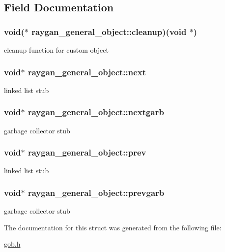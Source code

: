 \subsection{Field Documentation}
\hypertarget{structraygan__general__object_aa4c5799d4485b20618b80d670c55b598}{
\subsubsection[{cleanup}]{\setlength{\rightskip}{0pt plus 5cm}void($\ast$ raygan\+\_\+general\+\_\+object\+::cleanup)(void $\ast$)}}\label{structraygan__general__object_aa4c5799d4485b20618b80d670c55b598}
cleanup function for custom object \hypertarget{structraygan__general__object_abca7656e199e85edfa1304150cb2d7d9}{
\subsubsection[{next}]{\setlength{\rightskip}{0pt plus 5cm}void$\ast$ raygan\+\_\+general\+\_\+object\+::next}}\label{structraygan__general__object_abca7656e199e85edfa1304150cb2d7d9}
linked list stub \hypertarget{structraygan__general__object_a97be0f07a3b6afe858c5c6ba8f3e1987}{
\subsubsection[{nextgarb}]{\setlength{\rightskip}{0pt plus 5cm}void$\ast$ raygan\+\_\+general\+\_\+object\+::nextgarb}}\label{structraygan__general__object_a97be0f07a3b6afe858c5c6ba8f3e1987}
garbage collector stub \hypertarget{structraygan__general__object_aa8f4b6b7ad65fa40342f28c9ce30cb6b}{
\subsubsection[{prev}]{\setlength{\rightskip}{0pt plus 5cm}void$\ast$ raygan\+\_\+general\+\_\+object\+::prev}}\label{structraygan__general__object_aa8f4b6b7ad65fa40342f28c9ce30cb6b}
linked list stub \hypertarget{structraygan__general__object_a571269e726fb52755234c73b02ad9ea8}{
\subsubsection[{prevgarb}]{\setlength{\rightskip}{0pt plus 5cm}void$\ast$ raygan\+\_\+general\+\_\+object\+::prevgarb}}\label{structraygan__general__object_a571269e726fb52755234c73b02ad9ea8}
garbage collector stub 

The documentation for this struct was generated from the following file\+:\begin{DoxyCompactItemize}
\item 
\hyperlink{gob_8h}{gob.\+h}\end{DoxyCompactItemize}
